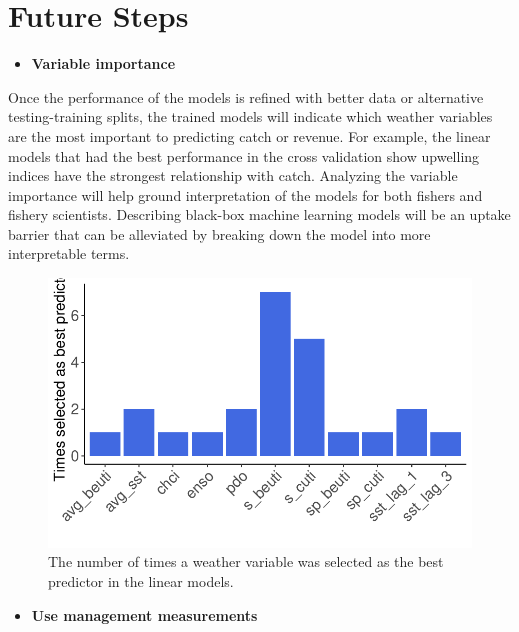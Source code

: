 \documentclass[
  letterpaper,
  DIV=11,
  numbers=noendperiod]{scrartcl}
\providecommand{\tightlist}{%
  \setlength{\itemsep}{0pt}\setlength{\parskip}{0pt}}\usepackage{longtable,booktabs,array}
\begin{document}
\hypertarget{sec-discussion}{%
\section{Future Steps}\label{sec-discussion}}

\begin{itemize}
\tightlist
\item
  \textbf{Variable importance}
\end{itemize}

Once the performance of the models is refined with better data or
alternative testing-training splits, the trained models will indicate
which weather variables are the most important to predicting catch or
revenue. For example, the linear models that had the best performance in
the cross validation show upwelling indices have the strongest
relationship with catch. Analyzing the variable importance will help
ground interpretation of the models for both fishers and fishery
scientists. Describing black-box machine learning models will be an
uptake barrier that can be alleviated by breaking down the model into
more interpretable terms.

\begin{figure}

{\centering \includegraphics{ibi-ml_files/figure-pdf/fig-var-1.pdf}

}

\caption{\label{fig-var}The number of times a weather variable was
selected as the best predictor in the linear models.}

\end{figure}

\begin{itemize}
\tightlist
\item
  \textbf{Use management measurements}
\end{itemize}
\end{document}
